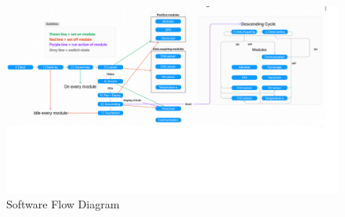 \documentclass[11pt]{article}
\begin{document}
\begin{enumerate}
\begin{figure}[H]
\includegraphics[width=19cm]{Software Diagram.png}
\centering
\caption{Software Flow Diagram}
\end{figure}
\end{enumerate}
\end{document}
